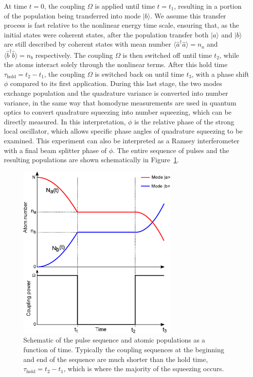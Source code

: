 \documentclass{iopart}
\begin{document}
At time $t=0$, the coupling $\Omega$ is applied until time $t=t_1$, resulting in a portion of the population being transferred into mode $|b\rangle$. We assume this transfer process is fast relative to the nonlinear energy time scale, ensuring that, as the initial states were coherent states, after the population transfer both $|a\rangle$ and $|b\rangle$ are still described by coherent states with mean number $\langle \hat{a}^{\dagger} \hat{a} \rangle = n_a$ and $\langle \hat{b}^{\dagger} \hat{b} \rangle = n_b$ respectively.  The coupling $\Omega$ is then switched off until time $t_2$, while the atoms interact solely through the nonlinear terms.   After this hold time $\tau_{\mathrm{hold}} = t_2 - t_1 $, the coupling $\Omega$ is switched back on until time $t_3$, with a phase shift $\phi$ compared to its first application. During this last stage, the two modes exchange population and the quadrature variance is converted into number variance, in the same way that homodyne measurements are used in quantum optics to convert quadrature squeezing into number squeezing, which can be directly measured. In this interpretation, $\phi$ is the relative phase of the strong local oscillator, which allows specific phase angles of quadrature squeezing to be examined.  This experiment can also be interpreted as a Ramsey interferometer with a final beam splitter phase of $\phi$.  The entire sequence of pulses and the resulting populations are shown schematically in Figure~\ref{figPulseScheme}.

\begin{figure}
    \centering
    \includegraphics[width=8cm]{figures/pulse_scheme.eps}
    \caption{Schematic of the pulse sequence and atomic populations as a function of time.  Typically the coupling sequences at the beginning and end of the sequence are much shorter than the hold time, $\tau_{\mathrm{hold}} = t_2 - t_1 $, which is where the majority of the squeezing occurs.}
    \label{figPulseScheme}
\end{figure}
\end{document}
